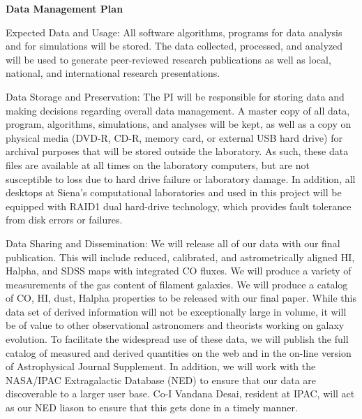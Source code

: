 \documentclass[11pt,preprint]{aastex}
\begin{document}
{\Large{\bf Data Management Plan}}


Expected Data and Usage:  All software algorithms, programs for data analysis and for simulations will be stored. The data collected, processed, and analyzed will be used to generate peer-reviewed research publications as well as local, national, and international research presentations. 

Data Storage and Preservation: The PI will be responsible for storing data and making decisions regarding overall data management. A master copy of all data, program, algorithms, simulations, and analyses will be kept, as well as a copy on physical media (DVD-R, CD-R, memory card, or external USB hard drive) for archival purposes that will be stored outside the laboratory. As such, these data files are available at all times on the laboratory computers, but are not susceptible to loss due to hard drive failure or laboratory damage. In addition, all desktops at Siena's computational laboratories and used in this project will be equipped with RAID1 dual hard-drive technology, which provides fault tolerance from disk errors or failures. 

Data Sharing and Dissemination: 
We will release all of our data with our final publication.  This will include 
reduced, calibrated, and astrometrically aligned HI,
Halpha, and SDSS maps with integrated CO fluxes.
We will produce a variety of measurements of the gas content of
filament galaxies.  We will produce a catalog of CO, HI, dust, Halpha
properties to be released with our final paper.
While this data set of derived information will not be exceptionally large in volume, it will be of value to other observational astronomers and theorists working on galaxy evolution. To facilitate the widespread use of these data, we will publish the full catalog of measured and derived quantities on the web and in the on-line version of Astrophysical Journal Supplement. In addition, we will work with the NASA/IPAC Extragalactic Database (NED) to ensure that our data are discoverable to a larger user base. Co-I Vandana Desai, resident at IPAC, will act as our NED liason to ensure that this gets done in a timely manner.
\end{document}

